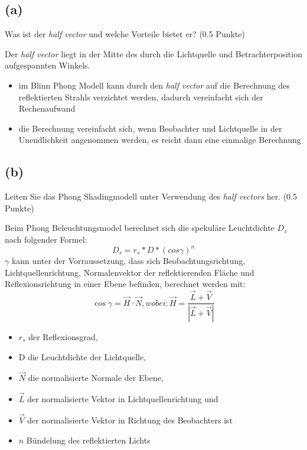 \documentclass[12pt]{scrreprt}
\begin{document}
\subsection*{(a)}
Was ist der \emph{half vector} und welche Vorteile bietet er? (0.5 Punkte)

Der \emph{half vector} liegt in der Mitte des durch die Lichtquelle und Betrachterposition aufgespannten Winkels.

\begin{itemize}
  \item im Blinn Phong Modell kann durch den \emph{half vector} auf die Berechnung des reflektierten Strahls verzichtet werden, dadurch vereinfacht sich der Rechenaufwand
  \item die Berechnung vereinfacht sich, wenn Beobachter und Lichtquelle in der Unendlichkeit angenommen werden, es reicht dann eine einmalige Berechnung
\end{itemize}

\subsection*{(b)}
Leiten Sie das Phong Shadingmodell unter Verwendung des \emph{half vectors} her. (0.5 Punkte)

Beim Phong Beleuchtungsmodel berechnet sich die spekuläre Leuchtdichte \(D_s\)
nach folgender Formel:
\[
D_s = r_s * D * (cos \gamma)^n
\]
\(\gamma\) kann unter der Vorraussetzung, dass sich Beobachtungsrichtung,
Lichtquellenrichtung, Normalenvektor der reflektierenden Fläche und
Reflexionsrichtung in einer Ebene befinden, berechnet werden mit:
\[
\cos\gamma = \vec{H} \cdot \vec{N}, wobei:  \vec{H} = \frac{\vec{L} + \vec{V}}{|\vec{L} + \vec{V}|}
\]

\begin{itemize}
  \item $r_s$ der Reflexionsgrad,
  \item D die Leuchtdichte der Lichtquelle,
  \item $\vec{N}$ die normalisierte Normale der Ebene,
  \item $\vec{L}$ der normalisierte Vektor in Lichtquellenrichtung und
  \item $\vec{V}$ der normalisierte Vektor in Richtung des Beobachters ist
  \item $n$ Bündelung des reflektierten Lichts
\end{itemize}
\end{document}
